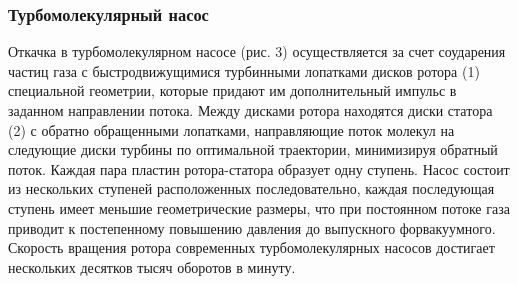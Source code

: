 \documentclass[a4paper,12pt]{article}
\theoremstyle{plain} %
\theoremstyle{definition} %
\theoremstyle{remark} %
\begin{document}
\subsubsection{Турбомолекулярный насос}
Откачка в турбомолекулярном насосе (рис. 3) осуществляется за счет соударения частиц газа с быстродвижущимися турбинными лопатками дисков ротора (1) специальной геометрии, которые придают им дополнительный импульс в заданном направлении потока. Между дисками ротора находятся диски статора (2) с обратно обращенными лопатками, направляющие поток молекул на следующие диски турбины по оптимальной траектории, минимизируя обратный поток. Каждая пара пластин ротора-статора образует одну ступень. Насос состоит из нескольких ступеней расположенных последовательно, каждая последующая ступень имеет меньшие геометрические размеры, что при постоянном потоке газа приводит к постепенному повышению давления до выпускного форвакуумного. Скорость вращения ротора современных турбомолекулярных насосов достигает нескольких десятков тысяч оборотов в минуту.
\end{document}
